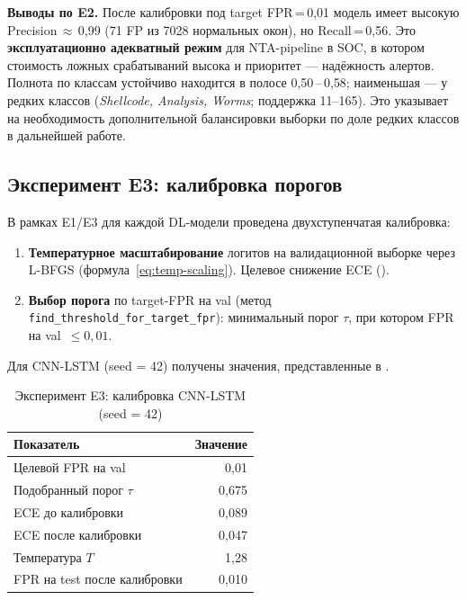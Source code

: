 \textbf{Выводы по E2.} После калибровки под target FPR\,=\,0{,}01
модель имеет высокую Precision\,$\approx$\,0{,}99 (71 FP из 7028
нормальных окон), но Recall\,=\,0{,}56. Это \textbf{эксплуатационно
адекватный режим} для NTA-pipeline в SOC, в котором стоимость
ложных срабатываний высока и приоритет --- надёжность алертов.
Полнота по классам устойчиво находится в полосе
0{,}50\,--\,0{,}58; наименьшая --- у редких классов
(\emph{Shellcode, Analysis, Worms}; поддержка 11--165). Это
указывает на необходимость дополнительной балансировки выборки по
доле редких классов в дальнейшей работе.

\subsection{Эксперимент E3: калибровка порогов}

В рамках E1/E3 для каждой DL-модели проведена двухступенчатая
калибровка:

\begin{enumerate}
    \item \textbf{Температурное масштабирование} логитов на
    валидационной выборке через L-BFGS (формула~\ref{eq:temp-scaling}).
    Целевое снижение ECE ().
    \item \textbf{Выбор порога} по target-FPR на val (метод
    \texttt{find\_threshold}\linebreak[1]\texttt{\_for\_target\_fpr}):
    минимальный порог $\tau$, при котором FPR на val~$\leq 0{,}01$.
\end{enumerate}

Для CNN-LSTM (seed = 42) получены значения, представленные в
.

\begin{table}[H]
\centering
\caption{Эксперимент E3: калибровка CNN-LSTM (seed = 42)}
\label{tab:E3-calibration}
\renewcommand{\arraystretch}{1.2}
\begin{tabular}{lr}
\toprule
\textbf{Показатель} & \textbf{Значение} \\
\midrule
Целевой FPR на val           & 0{,}01 \\
Подобранный порог $\tau$     & 0{,}675 \\
ECE до калибровки            & 0{,}089 \\
ECE после калибровки         & 0{,}047 \\
Температура $T$              & 1{,}28 \\
FPR на test после калибровки & 0{,}010 \\
\bottomrule
\end{tabular}
\end{table}

